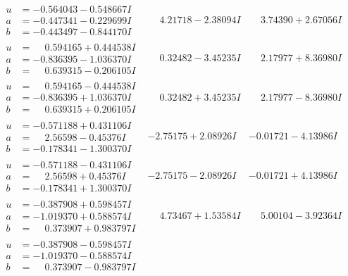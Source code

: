 \documentclass[1p]{elsarticle_modified}
\theoremstyle{definition}
\begin{document}
$$\begin{array}{c|c|c}
\begin{aligned}
u &= -0.564043 - 0.548667 I \\
a &= -0.447341 - 0.229699 I \\
b &= -0.443497 - 0.844170 I\end{aligned}
 & \phantom{-}4.21718 - 2.38094 I & \phantom{-}3.74390 + 2.67056 I \\ \hline\begin{aligned}
u &= \phantom{-}0.594165 + 0.444538 I \\
a &= -0.836395 - 1.036370 I \\
b &= \phantom{-}0.639315 - 0.206105 I\end{aligned}
 & \phantom{-}0.32482 - 3.45235 I & \phantom{-}2.17977 + 8.36980 I \\ \hline\begin{aligned}
u &= \phantom{-}0.594165 - 0.444538 I \\
a &= -0.836395 + 1.036370 I \\
b &= \phantom{-}0.639315 + 0.206105 I\end{aligned}
 & \phantom{-}0.32482 + 3.45235 I & \phantom{-}2.17977 - 8.36980 I \\ \hline\begin{aligned}
u &= -0.571188 + 0.431106 I \\
a &= \phantom{-}2.56598 - 0.45376 I \\
b &= -0.178341 - 1.300370 I\end{aligned}
 & -2.75175 + 2.08926 I & -0.01721 - 4.13986 I \\ \hline\begin{aligned}
u &= -0.571188 - 0.431106 I \\
a &= \phantom{-}2.56598 + 0.45376 I \\
b &= -0.178341 + 1.300370 I\end{aligned}
 & -2.75175 - 2.08926 I & -0.01721 + 4.13986 I \\ \hline\begin{aligned}
u &= -0.387908 + 0.598457 I \\
a &= -1.019370 + 0.588574 I \\
b &= \phantom{-}0.373907 + 0.983797 I\end{aligned}
 & \phantom{-}4.73467 + 1.53584 I & \phantom{-}5.00104 - 3.92364 I \\ \hline\begin{aligned}
u &= -0.387908 - 0.598457 I \\
a &= -1.019370 - 0.588574 I \\
b &= \phantom{-}0.373907 - 0.983797 I\end{aligned}

\end{array}$$
\end{document}
